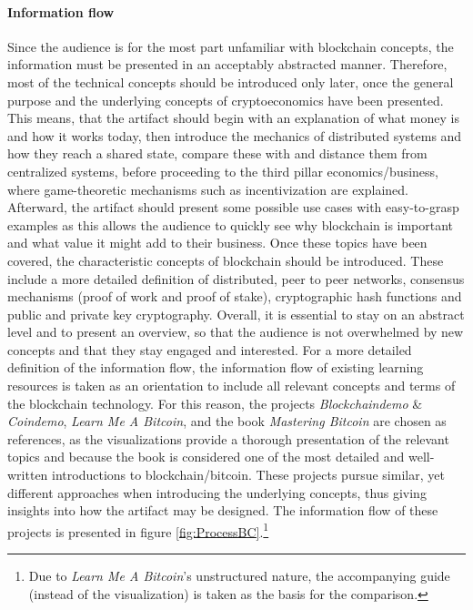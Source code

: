 \paragraph{Information flow} Since the audience is for the most part unfamiliar with blockchain concepts, the information must be presented in an acceptably abstracted manner. Therefore, most of the technical concepts should be introduced only later, once the general purpose and the underlying concepts of cryptoeconomics have been presented. This means, that the artifact should begin with an explanation of what money is and how it works today, then introduce the mechanics of distributed systems and how they reach a shared state, compare these with and distance them from centralized systems, before proceeding to the third pillar economics/business, where game-theoretic mechanisms such as incentivization are explained. Afterward, the artifact should present some possible use cases with easy-to-grasp examples as this allows the audience to quickly see why blockchain is important and what value it might add to their business. Once these topics have been covered, the characteristic concepts of blockchain should be introduced. These include a more detailed definition of distributed, peer to peer networks, consensus mechanisms (proof of work and proof of stake), cryptographic hash functions and public and private key cryptography. Overall, it is essential to stay on an abstract level and to present an overview, so that the audience is not overwhelmed by new concepts and that they stay engaged and interested. For a more detailed definition of the information flow, the information flow of existing learning resources is taken as an orientation to include all relevant concepts and terms of the blockchain technology. For this reason, the projects \textit{Blockchaindemo} \& \textit{Coindemo}, \textit{Learn Me A Bitcoin}, and the book \textit{Mastering Bitcoin} are chosen as references, as the visualizations provide a thorough presentation of the relevant topics and because the book is considered one of the most detailed and well-written introductions to blockchain/bitcoin. These projects pursue similar, yet different approaches when introducing the underlying concepts, thus giving insights into how the artifact may be designed. The information flow of these projects is presented in figure \ref{fig:ProcessBC}.\footnote{Due to \textit{Learn Me A Bitcoin}'s unstructured nature, the accompanying guide (instead of the visualization) is taken as the basis for the comparison.} 

